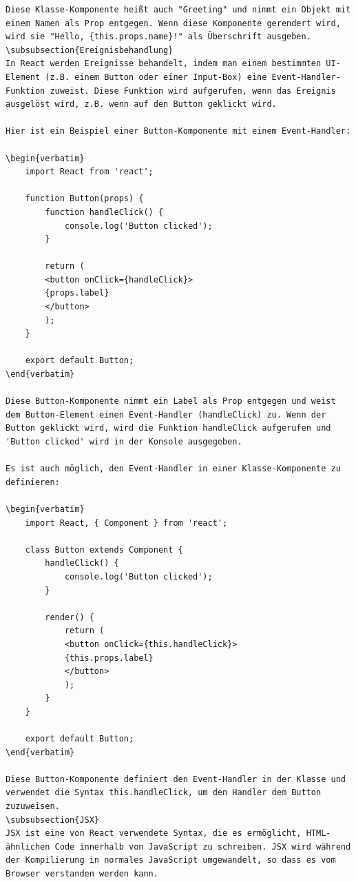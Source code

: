 \begin{lstlisting}
Diese Klasse-Komponente heißt auch "Greeting" und nimmt ein Objekt mit einem Namen als Prop entgegen. Wenn diese Komponente gerendert wird, wird sie "Hello, {this.props.name}!" als Überschrift ausgeben.
\subsubsection{Ereignisbehandlung}
In React werden Ereignisse behandelt, indem man einem bestimmten UI-Element (z.B. einem Button oder einer Input-Box) eine Event-Handler-Funktion zuweist. Diese Funktion wird aufgerufen, wenn das Ereignis ausgelöst wird, z.B. wenn auf den Button geklickt wird.

Hier ist ein Beispiel einer Button-Komponente mit einem Event-Handler:

\begin{verbatim}
	import React from 'react';
	
	function Button(props) {
		function handleClick() {
			console.log('Button clicked');
		}
		
		return (
		<button onClick={handleClick}>
		{props.label}
		</button>
		);
	}
	
	export default Button;
\end{verbatim}

Diese Button-Komponente nimmt ein Label als Prop entgegen und weist dem Button-Element einen Event-Handler (handleClick) zu. Wenn der Button geklickt wird, wird die Funktion handleClick aufgerufen und 'Button clicked' wird in der Konsole ausgegeben.

Es ist auch möglich, den Event-Handler in einer Klasse-Komponente zu definieren:

\begin{verbatim}
	import React, { Component } from 'react';
	
	class Button extends Component {
		handleClick() {
			console.log('Button clicked');
		}
		
		render() {
			return (
			<button onClick={this.handleClick}>
			{this.props.label}
			</button>
			);
		}
	}
	
	export default Button;
\end{verbatim}

Diese Button-Komponente definiert den Event-Handler in der Klasse und verwendet die Syntax this.handleClick, um den Handler dem Button zuzuweisen.
\subsubsection{JSX}
JSX ist eine von React verwendete Syntax, die es ermöglicht, HTML-ähnlichen Code innerhalb von JavaScript zu schreiben. JSX wird während der Kompilierung in normales JavaScript umgewandelt, so dass es vom Browser verstanden werden kann.


\end{lstlisting}
